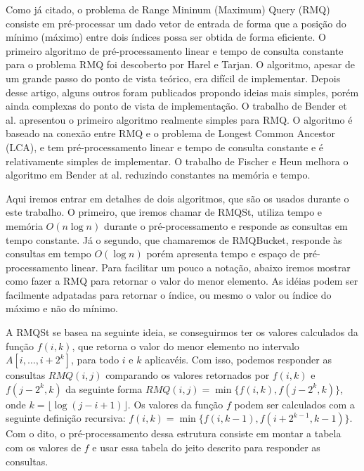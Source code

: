 \documentclass[dissertacao, brazil]{ThesisPUC}
\begin{document}
Como já citado, o problema de Range Mininum (Maximum) Query (RMQ) consiste em pré-processar um dado
vetor de entrada de forma que a posição do mínimo (máximo) entre dois índices possa
ser obtida de forma eficiente. O primeiro algoritmo de pré-processamento linear e tempo
de consulta constante para o problema RMQ foi descoberto por Harel e Tarjan\cite{lala}. 
O algoritmo, apesar de um grande passo do ponto de vista teórico, era difícil de implementar.
Depois desse artigo, alguns outros foram publicados propondo ideias mais simples, porém ainda
complexas do ponto de vista de implementação. O trabalho de Bender et al. \cite{lala} apresentou
o primeiro algoritmo realmente simples para RMQ. O algoritmo é baseado na conexão entre RMQ e
o problema de  Longest Common Ancestor (LCA), e tem pré-processamento linear e tempo de consulta
constante e é relativamente simples de implementar. O trabalho de Fischer e Heun\cite{} melhora
o algoritmo em Bender at al. reduzindo constantes na memória e tempo.

Aqui iremos entrar em detalhes de dois algoritmos, que são os usados
durante o este trabalho. O primeiro, que iremos chamar de RMQSt, utiliza
tempo e memória $O(n \log n)$ durante o  pré-processamento e responde as consultas
em tempo constante. Já o segundo, que chamaremos de RMQBucket, responde às consultas
em tempo $O(\log n)$ porém apresenta tempo e espaço de pré-processamento linear.
Para facilitar um pouco a notação, abaixo iremos mostrar como fazer a RMQ
para retornar o valor do menor elemento. As idéias podem ser facilmente adpatadas
para retornar o índice, ou mesmo o valor ou índice do máximo e não do mínimo.

A RMQSt se basea na seguinte ideia, se conseguirmos ter os valores calculados da
função $f(i, k)$, que retorna o valor do menor elemento no intervalo $A[i, \ldots, i + 2^k]$,
para todo $i$ e $k$ aplicavéis. Com isso, podemos responder as consultas $RMQ(i, j)$ comparando
os valores  retornados por $f(i, k)$ e $f(j - 2^k, k)$ da seguinte forma $RMQ(i, j) = \min\{f(i, k), f(j - 2^k, k)\}$,
onde $k = \lfloor\log(j - i + 1)\rfloor$. Os valores da função $f$ podem ser calculados com a seguinte definição recursiva:
$f(i, k) = \min\{f(i, k - 1), f(i + 2^{k-1}, k - 1)\}$. Com o dito, o pré-processamento dessa
estrutura consiste em montar a tabela com os valores de $f$ e usar essa tabela do jeito descrito para
responder as consultas.
\end{document}
